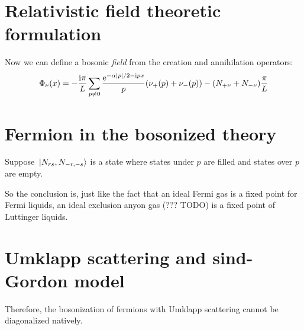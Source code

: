 \documentclass[hyperref, a4paper]{article}
\newcommand*{\ii}{\mathrm{i}}
\newcommand*{\ee}{\mathrm{e}}
\begin{document}
\section{Relativistic field theoretic formulation}

Now we can define a bosonic \emph{field} from the creation and annihilation operators:
\begin{equation}
    \Phi_\nu(x) = - \frac{\ii \pi}{L} \sum_{p \neq 0} \frac{\ee^{- \alpha \abs*{p} / 2 - \ii p x}}{p} (\nu_+(p) + \nu_-(p)) - (N_{+\nu} + N_{- \nu}) \frac{\pi}{L} %
\end{equation}

\section{Fermion in the bosonized theory}

Suppose $\ket*{N_{rs}, N_{-r, -s}}$ is a state where states under $p$ are filled and states over $p$ are empty.

So the conclusion is, just like the fact that an ideal Fermi gas is a fixed point for Fermi liquids, an ideal 
exclusion anyon gas (??? TODO) is a fixed point of Luttinger liquids. 

\section{Umklapp scattering and sind-Gordon model}

Therefore, the bosonization of fermions with Umklapp scattering cannot be diagonalized natively.



\end{document}
